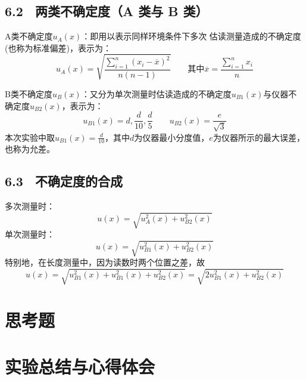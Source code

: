 \documentclass[UTF8]{article}
\theoremstyle{MyLineTheoremStyle} %
\theoremstyle{MyBlockTheoremStyle} %
\theoremstyle{MySubsubsectionStyle} %
\begin{document}
\subsection*{6.2 \ 两类不确定度（A 类与 B 类）}


A类不确定度$u_A(x)$：即用以表示同样环境条件下多次
估读测量造成的不确定度(也称为标准偏差)，表示为：
\begin{equation}
   u_A(x)=\sqrt{\frac{\sum_{i=1}^n(x_i-\overline x)^2}{n(n-1)}}\qquad \text{其中}\overline x=\frac{\sum_{i=1}^nx_i}{n} 
\end{equation}

B类不确定度$u_B(x)$：又分为单次测量时估读造成的不确定度$u_{B1}(x)$与仪器不确定度$u_{B2}(x)$，表示为：
\begin{equation}
   u_{B1}(x)=d,\frac{d}{10},\frac{d}{5}\qquad u_{B2}(x)=\frac{e}{\sqrt 3} 
\end{equation}
本次实验中取$u_{B1}(x)=\frac{d}{10}$，其中$d$为仪器最小分度值，$e$为仪器所示的最大误差，也称为允差。

\subsection*{6.3 \ 不确定度的合成}

多次测量时：
\begin{equation}
   u(x)=\sqrt{u_A^2(x)+u^2_{B2}(x)} 
\end{equation}
单次测量时：
\begin{equation}
    u(x)=\sqrt{u_{B1}^2(x)+u^2_{B2}(x)} 
\end{equation}
特别地，在长度测量中，因为读数时两个位置之差，故
\begin{equation}
    u(x)=\sqrt{u_{B1}^2(x)+u_{B1}^2(x)+u^2_{B2}(x)} =\sqrt{2u_{B1}^2(x)+u^2_{B2}(x)} 
\end{equation}


\section{思考题}

\section{实验总结与心得体会}
\end{document}
